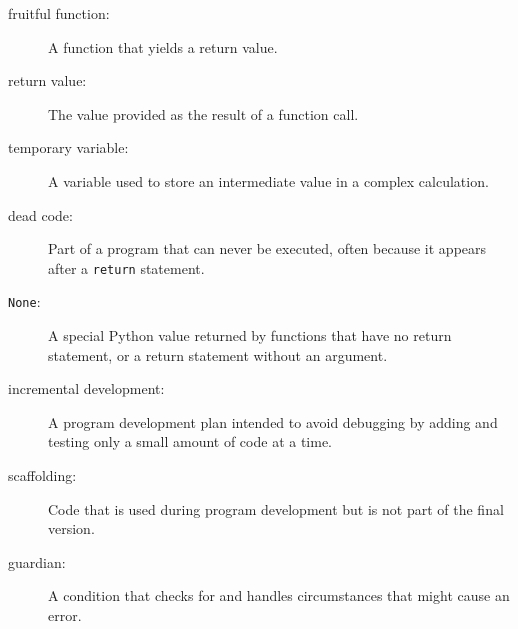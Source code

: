 \begin{description}

\item[fruitful function:] A function that yields a return value.

\item[return value:]  The value provided as the result of a function call.

\item[temporary variable:]  A variable used to store an intermediate value in
a complex calculation.

\item[dead code:]  Part of a program that can never be executed, often because
it appears after a {\tt return} statement.

\item[{\tt None}:]  A special Python value returned by functions that
have no return statement, or a return statement without an argument.

\item[incremental development:]  A program development plan intended to
avoid debugging by adding and testing only
a small amount of code at a time.

\item[scaffolding:]  Code that is used during program development but is
not part of the final version.

\item[guardian:]  A condition that checks for and handles circumstances that
might cause an error.


\end{description}
